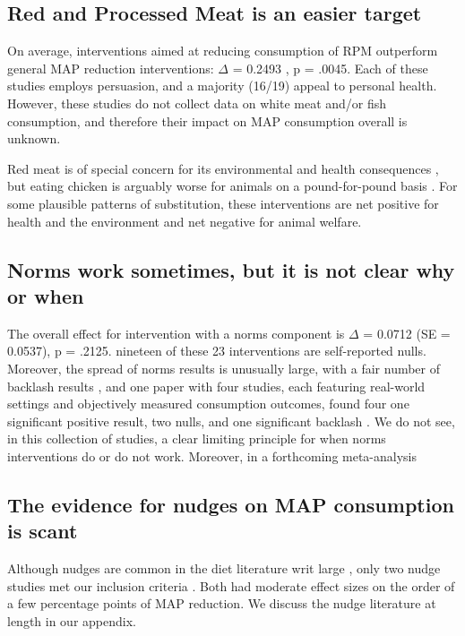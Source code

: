 \documentclass[sn-nature,pdflatex]{sn-jnl}
\begin{document}
\subsection{Red and Processed Meat is an easier target}\label{sec2.4}

On average, interventions aimed at reducing consumption of RPM
outperform general MAP reduction interventions: \(\Delta\) = 0.2493
, p = .0045. Each of these studies employs
persuasion, and a majority (16/19) appeal to personal health. However,
these studies do not collect data on white meat and/or fish consumption,
and therefore their impact on MAP consumption overall is unknown.

Red meat is of special concern for its environmental and health
consequences \citep{grummon2023}, but eating chicken is arguably worse
for animals on a pound-for-pound basis \citep{mathur2022ethical}. For
some plausible patterns of substitution, these interventions are net
positive for health and the environment and net negative for animal
welfare.

\subsection{Norms work sometimes, but it is not clear why or
when}\label{sec2.5}

The overall effect for intervention with a norms component is \(\Delta\)
= 0.0712 (SE = 0.0537), p = .2125. nineteen of these 23 interventions
are self-reported nulls. Moreover, the spread of norms results is
unusually large, with a fair number of backlash results
\citep{mattson2020, griesoph2021}, and one paper with four studies, each
featuring real-world settings and objectively measured consumption
outcomes, found four one significant positive result, two nulls, and one
significant backlash \citep{sparkman2020}. We do not see, in this
collection of studies, a clear limiting principle for when norms
interventions do or do not work. Moreover, in a forthcoming
meta-analysis

\subsection{The evidence for nudges on MAP consumption is
scant}\label{sec2.6}

Although nudges are common in the diet literature writ large
\citep{olafsson2024, cadario2020, szaszi2018}, only two nudge studies
met our inclusion criteria \citep{andersson2021}. Both had moderate
effect sizes on the order of a few percentage points of MAP reduction.
We discuss the nudge literature at length in our appendix.
\end{document}
